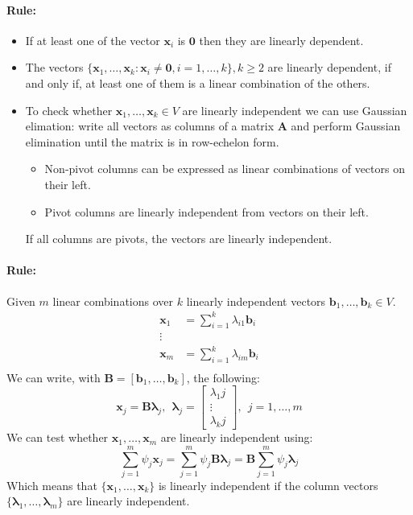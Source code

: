 \documentclass[12pt]{article}
\newcommand{\bx}{{\bm{x}}}
\newcommand{\A}{{\bm{A}}}
\newcommand{\B}{{\bm{B}}}
\newcommand{\vecs}[2]{{\bm{#1}_1, \dots, \bm{#1}_#2}}
\newcommand{\xrule}[1]{\paragraph{\colorbox{#1!30}{\textbf{Rule:}}}}
\begin{document}
\xrule{green}
%
\begin{itemize}
  \item If at least one of the vector $\bm{x}_i$ is $\bm{0}$ then they are linearly dependent.
  \item The vectors $\{\bx_1, \dots, \bx_k : \bx_i \neq \bm0, i =1, \dots, k\} , k \geqslant 2$ are linearly dependent, if and only if, at least one of them is a linear combination of the others.
  \item To check whether $\bx_1, \dots, \bx_k \in V$ are linearly independent we can use Gaussian elimation: write all vectors as columns of a matrix $\A$ and perform Gaussian elimination until the matrix is in row-echelon form.\begin{itemize}
  \item Non-pivot columns can be expressed as linear combinations of vectors on their left.
  \item Pivot columns are linearly independent from vectors on their left.
	  \end{itemize}
	  If all columns are pivots, the vectors are linearly independent.
\end{itemize}

\xrule{blue} Given $m$ linear combinations over $k$ linearly independent vectors $\bm{b}_1, \dots, \bm{b}_k \in V$.
%
\begin{equation}
	\begin{aligned}
		\bx_1 &= \sum\limits_{i=1}^k \lambda_{i1} \bm{b}_i \\
		\vdots & \\
		\bx_m &= \sum\limits_{i=1}^k \lambda_{im} \bm{b}_i \\
	\end{aligned}
\end{equation}
%
We can write, with $\B = [\bm{b}_1, \dots, \bm{b}_k]$, the following:
%
\begin{equation}
	\bx_j = \bm{B} \bm{\lambda}_j, \ \ \bm{\lambda}_j = \begin{bmatrix}
		\lambda_1j \\
		\vdots \\
		\lambda_kj
	\end{bmatrix}, \ \ j = 1, \dots,m 
\end{equation}
%
We can test whether $\bx_1, \dots, \bx_m$ are linearly independent using:
\begin{equation}
	\sum\limits_{j=1}^m \psi_j \bx_j = \sum\limits_{j=1}^m \psi_j \B\bm{\lambda}_j = \B \sum\limits_{j=1}^m \psi_j \bm{\lambda}_j
\end{equation}
%
Which means that $\{\vecs{x}{k}\}$ is linearly independent if the column vectors $\{\vecs{\lambda}{m}\}$ are linearly independent.
\end{document}
